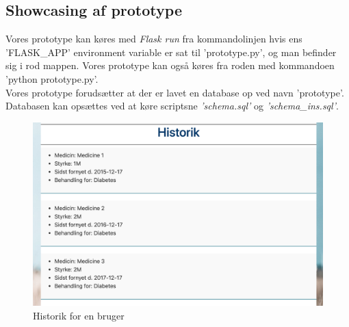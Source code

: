 \newpage
\subsection{Showcasing af prototype}
Vores prototype kan køres med \textit{Flask run} fra kommandolinjen hvis ens 'FLASK\_APP' environment variable er sat til 'prototype.py', og man befinder sig i rod mappen. Vores prototype kan også køres fra roden med kommandoen 'python prototype.py'.\\
Vores prototype forudsætter at der er lavet en database op ved navn 'prototype'. Databasen kan opsættes ved at køre scriptsne \textit{'schema.sql'} og \textit{'schema\_ins.sql'}.

\begin{figure}[h!]
	\includegraphics[width=\linewidth]{Materials/Prototype/Historik}
	\caption{Historik for en bruger}
\end{figure}

